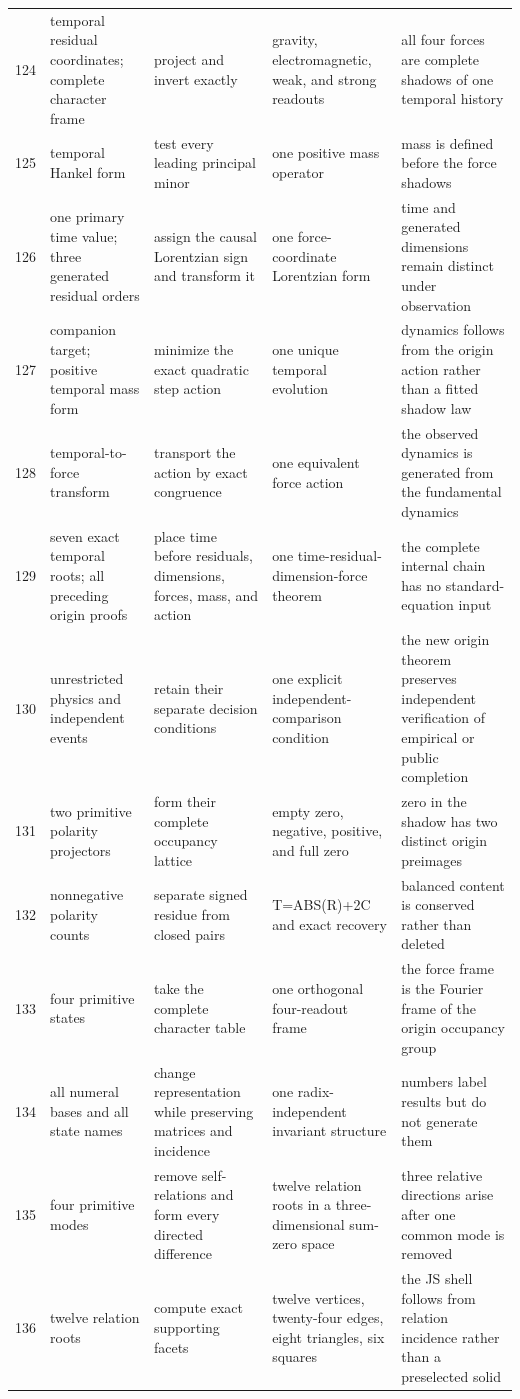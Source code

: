 \documentclass[11pt]{article}
\numberwithin{equation}{section}
\theoremstyle{remark}
\begin{document}
\begin{landscape}
\begin{longtable}{p{0.65cm}p{3.5cm}p{4.0cm}p{4.0cm}p{4.6cm}}
124&temporal residual coordinates; complete character frame&project and invert exactly&gravity, electromagnetic, weak, and strong readouts&all four forces are complete shadows of one temporal history\\
125&temporal Hankel form&test every leading principal minor&one positive mass operator&mass is defined before the force shadows\\
126&one primary time value; three generated residual orders&assign the causal Lorentzian sign and transform it&one force-coordinate Lorentzian form&time and generated dimensions remain distinct under observation\\
127&companion target; positive temporal mass form&minimize the exact quadratic step action&one unique temporal evolution&dynamics follows from the origin action rather than a fitted shadow law\\
128&temporal-to-force transform&transport the action by exact congruence&one equivalent force action&the observed dynamics is generated from the fundamental dynamics\\
129&seven exact temporal roots; all preceding origin proofs&place time before residuals, dimensions, forces, mass, and action&one time-residual-dimension-force theorem&the complete internal chain has no standard-equation input\\
130&unrestricted physics and independent events&retain their separate decision conditions&one explicit independent-comparison condition&the new origin theorem preserves independent verification of empirical or public completion\\
131&two primitive polarity projectors&form their complete occupancy lattice&empty zero, negative, positive, and full zero&zero in the shadow has two distinct origin preimages\\
132&nonnegative polarity counts&separate signed residue from closed pairs&T=ABS(R)+2C and exact recovery&balanced content is conserved rather than deleted\\
133&four primitive states&take the complete character table&one orthogonal four-readout frame&the force frame is the Fourier frame of the origin occupancy group\\
134&all numeral bases and all state names&change representation while preserving matrices and incidence&one radix-independent invariant structure&numbers label results but do not generate them\\
135&four primitive modes&remove self-relations and form every directed difference&twelve relation roots in a three-dimensional sum-zero space&three relative directions arise after one common mode is removed\\
136&twelve relation roots&compute exact supporting facets&twelve vertices, twenty-four edges, eight triangles, six squares&the JS shell follows from relation incidence rather than a preselected solid\\
\bottomrule\end{longtable}

\end{landscape}
\end{document}
